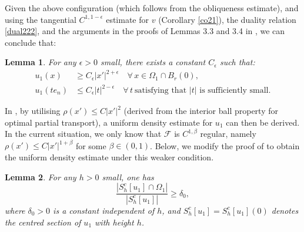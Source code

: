 \documentclass[11pt]{amsart}
\theoremstyle{plain}
\newtheorem{lemma}{Lemma}[section]
\newcommand{\0}{\textbf{0}}
\numberwithin{equation}{section}
\numberwithin{equation}{section}
\numberwithin{figure}{section}
\begin{document}
Given the above configuration (which follows from the obliqueness estimate), and using the tangential $C^{1,1-\epsilon}$ estimate for $v$ (Corollary \ref{co21}), the duality relation \eqref{dual222}, and the arguments in the proofs of Lemmas 3.3 and 3.4 in \cite{CLW3}, we can conclude that:
\begin{lemma} \label{tc12}
For any $\epsilon>0$ small, there exists a constant $C_\epsilon$ such that:
\begin{align}
    u_1(x) &\geq C_\epsilon |x'|^{2+\epsilon} \quad \forall\, x \in \Omega_1\cap B_r(0), \label{ustconv} \\
    u_1(te_n) &\leq C_\epsilon |t|^{2-\epsilon} \quad \forall\, t\ \text{satisfying that \(|t|\) is sufficiently small}. \nonumber
\end{align}
\end{lemma}

In \cite{CLW3}, by utilising $\rho(x') \leq C|x'|^2$ (derived from the interior ball property for optimal partial transport), a uniform density estimate for $u_1$ can then be derived. 
In the current situation, we only know that $\mathcal{F}$ is $C^{1,\beta}$ regular, namely $\rho(x') \leq C|x'|^{1+\beta}$ for some $\beta\in(0,1)$.
Below, we modify the proof of \cite[Lemma 3.5]{CLW3} to obtain the uniform density estimate under this weaker condition. 
\begin{lemma} \label{ud3}
For any $h>0$ small, one has 
\[
\frac{|S^c_h[u_1] \cap \Omega_1|}{|S^c_h[u_1]|} \geq \delta_0,
\]
where $\delta_0 > 0$ is a constant independent of $h$, and $S^c_h[u_1] = S^c_h[u_1](0)$ denotes the centred section of $u_1$ with height $h$.
\end{lemma}
\end{document}
